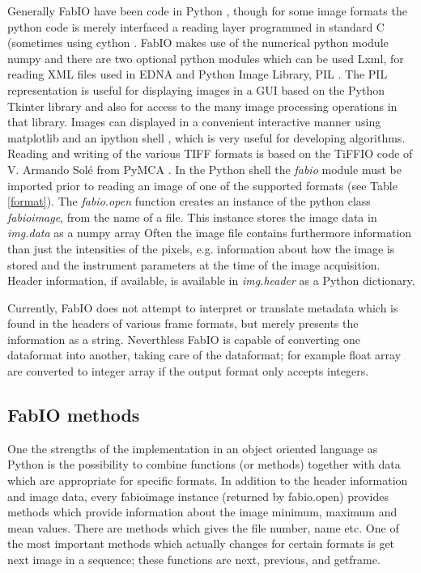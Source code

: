 \documentclass{iucr}
\begin{document}
Generally FabIO have been code in Python \cite{python},
though for some image formats the python code is merely interfaced a reading
layer programmed in standard C (sometimes using cython \cite{cython}.
FabIO makes use of the numerical python module numpy \cite{numpy} and there are
two optional python modules which can be used Lxml, for reading XML files
used in EDNA \cite{edna} and Python Image Library, PIL \cite{pil}.
The PIL representation is useful for displaying images in a GUI based on
the Python Tkinter library and also for access
to the many image processing operations in that library.
Images can displayed in a convenient interactive manner using
matplotlib \cite{matplotlib} and an ipython shell \cite{ipython}, which is
very useful for developing algorithms.
Reading and writing of the various TIFF \cite{tiff} formats is based on the
TiFFIO code of V. Armando Sol\'e from PyMCA \cite{pymca}.
In the Python shell the {\em fabio} module must be imported prior to reading an
image of one of the supported formats (see Table \ref{format}).
The {\em fabio.open} function creates an instance of the python class {\em fabioimage},
from the name of a file.
This instance stores the image data in {\em img.data} as a numpy array
Often the image file contains furthermore information than just
the intensities of the pixels, e.g. information about how the image is
stored and the instrument parameters at the time of the image acquisition.
Header information, if available, is available in {\em img.header} as a Python
dictionary.

Currently, FabIO does not attempt to interpret or translate metadata which
is found in the headers of various frame formats, but merely presents the
information as a string. Neverthless FabIO is capable of converting one
dataformat into another, taking care of the dataformat; for example float array
are converted to integer array if the output format only accepts integers.


\subsection{FabIO methods}

One the strengths of the implementation in an object oriented language as Python
is the possibility to combine functions (or methods) together with data which
are appropriate for specific formats.
In addition to the header information and image data, every fabioimage instance
(returned by fabio.open) provides methods which provide information about the image minimum, maximum and mean values.
There are methods which gives the file number, name etc. One of the most important methods which  actually changes for certain formats
is get next image in a sequence; these functions are next, previous, and
getframe.
\end{document}
